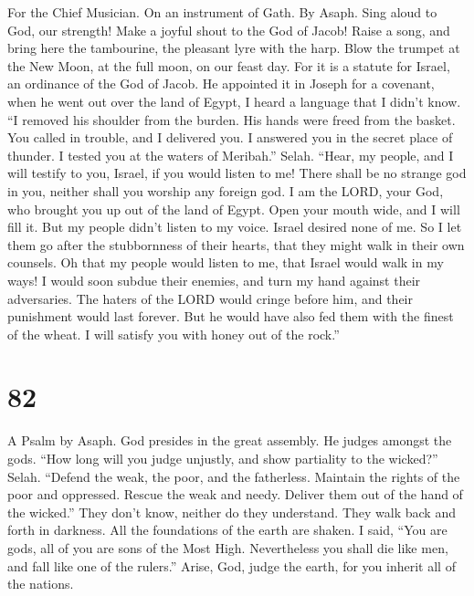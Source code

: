 For the Chief Musician. On an instrument of Gath. By Asaph. 
Sing aloud to God, our strength! Make a joyful shout to the God of
Jacob!  Raise a song, and bring here the tambourine, the
pleasant lyre with the harp.  Blow the trumpet at the New
Moon, at the full moon, on our feast day.  For it is a
statute for Israel, an ordinance of the God of Jacob.  He
appointed it in Joseph for a covenant, when he went out over the land of
Egypt, I heard a language that I didn't know.  ``I removed
his shoulder from the burden. His hands were freed from the basket.
 You called in trouble, and I delivered you. I answered you
in the secret place of thunder. I tested you at the waters of Meribah.''
Selah.  ``Hear, my people, and I will testify to you,
Israel, if you would listen to me!  There shall be no
strange god in you, neither shall you worship any foreign god.
 I am the LORD, your God, who brought you up out of the
land of Egypt. Open your mouth wide, and I will fill it. 
But my people didn't listen to my voice. Israel desired none of me.
 So I let them go after the stubbornness of their hearts,
that they might walk in their own counsels.  Oh that my
people would listen to me, that Israel would walk in my ways!
 I would soon subdue their enemies, and turn my hand
against their adversaries.  The haters of the LORD would
cringe before him, and their punishment would last forever.
 But he would have also fed them with the finest of the
wheat. I will satisfy you with honey out of the rock.''

\hypertarget{section-74}{%
\section{82}\label{section-74}}

A Psalm by Asaph.  God presides in the great assembly. He
judges amongst the gods.  ``How long will you judge
unjustly, and show partiality to the wicked?'' Selah. 
``Defend the weak, the poor, and the fatherless. Maintain the rights of
the poor and oppressed.  Rescue the weak and needy. Deliver
them out of the hand of the wicked.''  They don't know,
neither do they understand. They walk back and forth in darkness. All
the foundations of the earth are shaken.  I said, ``You are
gods, all of you are sons of the Most High.  Nevertheless
you shall die like men, and fall like one of the rulers.'' 
Arise, God, judge the earth, for you inherit all of the nations.

